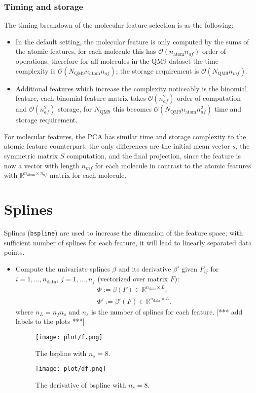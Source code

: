 \documentclass[12pt]{article}
\def\att{                    %
        \marginpar[ \hspace*{\fill} \raisebox{-0.2em}{\rule{2mm}{1.2em}} ]
        {\raisebox{-0.2em}{\rule{2mm}{1.2em}} }
        }
\def\at#1{[*** \att #1 ***]}  %
\begin{document}
\subsubsection{Timing and storage}
The timing breakdown of the molecular feature selection is as the following:
\begin{itemize}
	\item In the default setting, the molecular feature is only computed by the sums of the atomic features, for each molecule this has $\mathcal{O}(n_\text{atom} n_{af})$ order of operations, therefore for all molecules in the QM9 dataset the time complexity is $\mathcal{O}(N_\text{QM9}n_\text{atom} n_{af})$; the storage requirement is $\mathcal{O}(N_\text{QM9}n_{mf})$. 
	\item Additional features which increase the complexity noticeably is the binomial feature, each binomial feature matrix takes $\mathcal{O}(n^2_{af})$ order of computation and $\mathcal{O}(n^2_{af})$ storage, for $N_\text{QM9}$ this becomes $\mathcal{O}(N_\text{QM9}n_\text{atom}n^2_{af})$ time and storage requirement.
\end{itemize}
For molecular features, the PCA has similar time and storage complexity to the atomic feature counterpart, the only differences are the initial mean vector $s$, the symmetric matrix $S$ computation, and the final projection, since the feature is now a vector with length $n_{mf}$ for each molecule in contrast to the atomic features with $\mathbb{R}^{n_\text{atom} \times n_{af}}$ matrix for each molecule.


\section{Splines}
\label{sec:spline}
Splines (\texttt{bspline}) are used to increase the dimension of the feature space; with sufficient number of splines for each feature, it will lead to linearly separated data points.
\begin{itemize}
	\item Compute the univariate splines $\beta$ and its derivative $\beta'$ given $F_{ij}$ for $i = 1,...,n_\text{data}$, $j = 1,...,n_f$ (vectorized over matrix $F$):
	\begin{equation}
		\label{eq:spline}
		\begin{split}
			\Phi := \beta(F) \in \mathbb{R}^{n_\text{data} \times L}, \\
			\Phi' := \beta'(F) \in \mathbb{R}^{n_\text{data} \times L}.
		\end{split}
	\end{equation}
	where $n_L = n_fn_s$ and $n_s$ is the number of splines for each feature.
	\at{add labels to the plots}
	\begin{figure}[h]
		\label{fig:spline}
		\centering
		\texttt{[image: plot/f.png]}
		\caption{The bspline with $n_s = 8$.}
	\end{figure}
	\begin{figure}[H]
		\label{fig:dspline}
		\centering
		\texttt{[image: plot/df.png]}
		\caption{The derivative of bspline with $n_s = 8$.}
	\end{figure}
\end{itemize}
\end{document}
